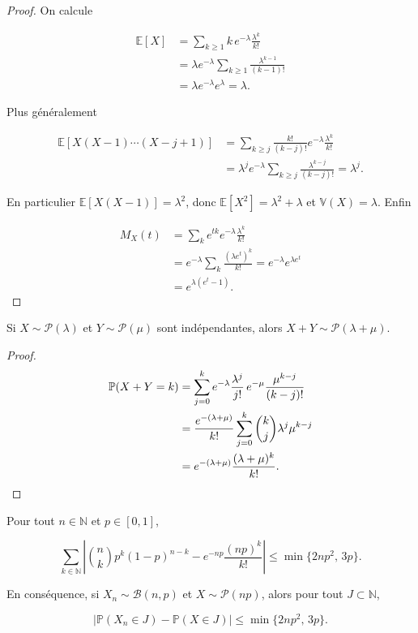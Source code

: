 \begin{proof}
On calcule

\begin{align*}
  \mathbb{E}[X] &=\sum_{k\ge1}k\,e^{-\lambda}\frac{\lambda^k}{k!} \\
  &=\lambda e^{-\lambda}\sum_{k\ge1}\frac{\lambda^{k-1}}{(k-1)!} \\
  &=\lambda e^{-\lambda}e^{\lambda}=\lambda.
\end{align*}

Plus généralement

\begin{align*}
\mathbb{E}[X(X-1)\cdots(X-j+1)] &=\sum_{k\ge j}\frac{k!}{(k-j)!}e^{-\lambda}\frac{\lambda^k}{k!} \\
&=\lambda^j e^{-\lambda}\sum_{k\ge j}\frac{\lambda^{k-j}}{(k-j)!}=\lambda^j.
\end{align*}

En particulier $\mathbb{E}[X(X-1)]=\lambda^2$, donc $\mathbb{E}[X^2]=\lambda^2+\lambda$ et $\mathbb{V}(X)=\lambda$. Enfin

\begin{align*}
M_X(t) &=\sum_k e^{tk}e^{-\lambda}\frac{\lambda^k}{k!} \\
&=e^{-\lambda}\sum_k\frac{(\lambda e^t)^k}{k!}=e^{-\lambda}e^{\lambda e^t} \\
&=e^{\lambda(e^t-1)}.
\end{align*}
\end{proof}

\begin{mdframed}
\begin{proposition}
Si $X\sim\mathcal{P}(\lambda)$ et $Y\sim\mathcal{P}(\mu)$ sont indépendantes, alors $X+Y\sim\mathcal{P}(\lambda+\mu)$.
\end{proposition}
\end{mdframed}

\begin{proof}
\begin{align*}
  \mathbb{P}(X+Y=k) &=\sum_{j=0}^k e^{-\lambda}\frac{\lambda^j}{j!}\, e^{-\mu}\frac{\mu^{k-j}}{(k-j)!} \\
  &=\frac{e^{-(\lambda+\mu)}}{k!}\sum_{j=0}^k\binom kj\lambda^j\mu^{k-j} \\
  &=e^{-(\lambda+\mu)}\frac{(\lambda+\mu)^k}{k!}. \qedhere
\end{align*}
\end{proof}

\begin{mdframed}
\begin{theoreme}
\label{th:poisson-binom}
Pour tout $n\in\mathbb{N}$ et $p\in[0,1]$,

$$
  \sum_{k\in\mathbb{N}}\left|\binom nk p^k(1-p)^{n-k}-e^{-np}\frac{(np)^k}{k!}\right|
  \le \min\{2np^2,\,3p\}.
$$

En conséquence, si $X_n\sim\mathcal{B}(n,p)$ et $X\sim\mathcal{P}(np)$, alors pour tout $J\subset\mathbb{N}$,

$$
  \big|\mathbb{P}(X_n\in J)-\mathbb{P}(X\in J)\big|\le \min\{2np^2,\,3p\}.
$$
\end{theoreme}
\end{mdframed}

